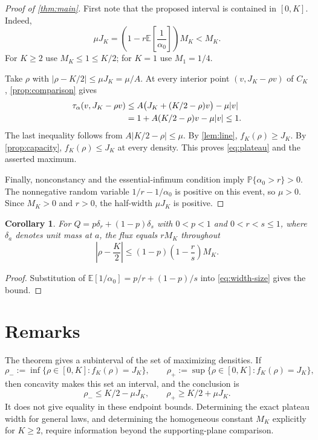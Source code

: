 \documentclass[11pt]{amsart}
\newtheorem{corollary}[theorem]{Corollary}
\theoremstyle{remark}
\newcommand{\EE}{\mathbb E}
\newcommand{\PP}{\mathbb P}
\numberwithin{equation}{section}
\begin{document}
\begin{proof}[Proof of \cref{thm:main}]
First note that the proposed interval is contained in $[0,K]$.
Indeed,
\begin{equation}\label{eq:width-size}
 \mu J_K=\left(1-r\EE\!\left[\frac1{\alpha_0}\right]\right)M_K
             <M_K.
\end{equation}
For $K\geq2$ use $M_K\leq1\leq K/2$; for $K=1$ use $M_1=1/4$.

Take $\rho$ with $|\rho-K/2|\leq\mu J_K=\mu/A$. At every interior
point $(v,J_K-\rho v)$ of $C_K$, \cref{prop:comparison} gives
\begin{align}
 \tau_\alpha(v,J_K-\rho v)
 &\leq A\bigl(J_K+(K/2-\rho)v\bigr)-\mu|v|\notag\\
 &=1+A(K/2-\rho)v-\mu|v|\leq1.\label{eq:line-bound}
\end{align}
The last inequality follows from $A|K/2-\rho|\leq\mu$.
By \cref{lem:line}, $f_K(\rho)\geq J_K$. By
\cref{prop:capacity}, $f_K(\rho)\leq J_K$ at every density. This
proves \eqref{eq:plateau} and the asserted maximum.

Finally, nonconstancy and the essential-infimum condition imply
$\PP\{\alpha_0>r\}>0$. The nonnegative random variable
$1/r-1/\alpha_0$ is positive on this event, so $\mu>0$.
Since $M_K>0$ and $r>0$, the half-width $\mu J_K$ is positive.
\end{proof}

\begin{corollary}\label{cor:binary}
For $Q=p\delta_r+(1-p)\delta_s$ with $0<p<1$ and
$0<r<s\leq1$, where $\delta_a$ denotes unit mass at $a$, the flux
equals $rM_K$ throughout
\[
 \left|\rho-\frac K2\right|
 \leq (1-p)\left(1-\frac rs\right)M_K.
\]
\end{corollary}

\begin{proof}
Substitution of $\EE[1/\alpha_0]=p/r+(1-p)/s$ into
\eqref{eq:width-size} gives the bound.
\end{proof}

\section{Remarks}

The theorem gives a subinterval of the set of maximizing densities.
If
\[
 \rho_-:=\inf\{\rho\in[0,K]:f_K(\rho)=J_K\},\qquad
 \rho_+:=\sup\{\rho\in[0,K]:f_K(\rho)=J_K\},
\]
then concavity makes this set an interval, and the conclusion is
\[
 \rho_-\leq K/2-\mu J_K,
 \qquad \rho_+\geq K/2+\mu J_K.
\]
It does not give equality in these endpoint bounds. Determining the
exact plateau width for general laws, and determining the homogeneous
constant $M_K$ explicitly for $K\geq2$, require information beyond
the supporting-plane comparison.
\end{document}
